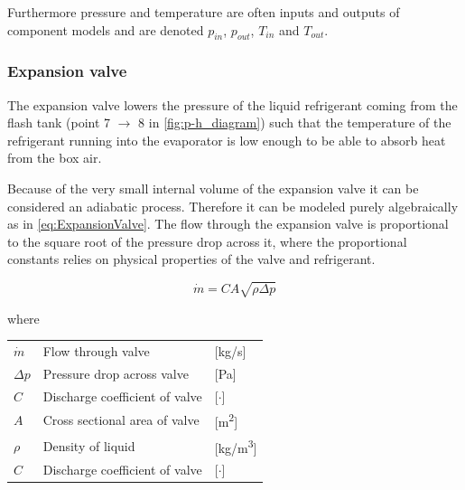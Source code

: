 Furthermore pressure and temperature are often inputs and outputs of component models and are denoted $p_{in}$, $p_{out}$, $T_{in}$ and $T_{out}$.

\subsubsection{Expansion valve}\label{sec:componentModel_Val}
The expansion valve lowers the pressure of the liquid refrigerant coming from the flash tank (point 7 $\rightarrow$ 8 in \cref{fig:p-h_diagram}) such that the temperature of the refrigerant running into the evaporator is low enough to be able to absorb heat from the box air.

Because of the very small internal volume of the expansion valve it can be considered an adiabatic process. Therefore it can be modeled purely algebraically as in \cref{eq:ExpansionValve}. The flow through the expansion valve is proportional to the square root of the pressure drop across it, where the proportional constants relies on physical properties of the valve and refrigerant.

\begin{equation} \label{eq:ExpansionValve}
	\dot{m}= C A \sqrt{\rho\Delta p}
\end{equation}

where

\begin{center}
	\begin{tabular}{l p{6cm} l}
		$\dot{m}$  & Flow through valve             & [\si{kg}/\si{s}]   \\
		$\Delta p$ & Pressure drop across valve     & [\si{Pa}]          \\
		$C$        & Discharge coefficient of valve & [$\cdot$]          \\
		$A$        & Cross sectional area of valve  & [\si{m^2}]         \\
		$\rho$     & Density of liquid              & [\si{kg}/\si{m^3}] \\
		$C$        & Discharge coefficient of valve & [$\cdot$]
	\end{tabular}
\end{center}

